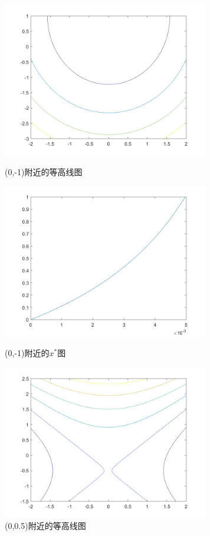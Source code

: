 \documentclass{article}
\begin{document}
\begin{figure}[htbp]
\begin{minipage}[t]{0.6\textwidth}
\centering
\includegraphics[width=9cm]{01g.jpg}
\caption{(0,-1)附近的等高线图}
\end{minipage}

\begin{minipage}[t]{0.6\textwidth}
\centering
\includegraphics[width=9cm]{01x.jpg}
\caption{(0,-1)附近的$x^*$图}
\end{minipage}

\begin{minipage}[t]{0.6\textwidth}
\centering
\includegraphics[width=9cm]{005g.jpg}
\caption{(0,0.5)附近的等高线图}
\end{minipage}
\end{figure}
\end{document}
